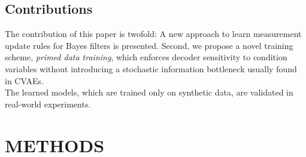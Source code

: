 \documentclass[letterpaper, 10 pt, journal, twoside]{ieeetran}  %
\begin{document}
\subsection{Contributions}
The contribution of this paper is twofold:
A new approach to learn measurement update rules for Bayes filters is presented.
Second, we propose a novel training scheme, \textit{primed data training}, which enforces decoder sensitivity to condition variables without introducing a stochastic information bottleneck usually found in CVAEs.\\
The learned models, which are trained only on synthetic data, are validated in real-world experiments.


\section{METHODS}
\label{sec:methods}
\end{document}
